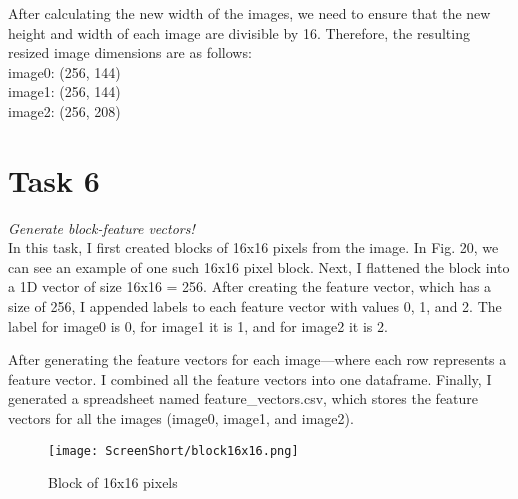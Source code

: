 \documentclass[conference,12pt]{IEEEtran}
\begin{document}
After calculating the new width of the images, we need to ensure that the new height and width of each image are divisible by 16. Therefore, the resulting resized image dimensions are as follows:\\
image0: (256, 144)\\
image1: (256, 144)\\
image2: (256, 208)\\

\section{Task 6}
\textit{Generate block-feature vectors!}\\
In this task, I first created blocks of 16x16 pixels from the image. In Fig. 20, we can see an example of one such 16x16 pixel block. Next, I flattened the block into a 1D vector of size 16x16 = 256. After creating the feature vector, which has a size of 256, I appended labels to each feature vector with values 0, 1, and 2. The label for image0 is 0, for image1 it is 1, and for image2 it is 2.

After generating the feature vectors for each image—where each row represents a feature vector. I combined all the feature vectors into one dataframe. Finally, I generated a spreadsheet named feature\_vectors.csv, which stores the feature vectors for all the images (image0, image1, and image2).
\begin{figure}[h]
    \centering
    \texttt{[image: ScreenShort/block16x16.png]}
    \caption{Block of 16x16 pixels}
\end{figure}
\end{document}
